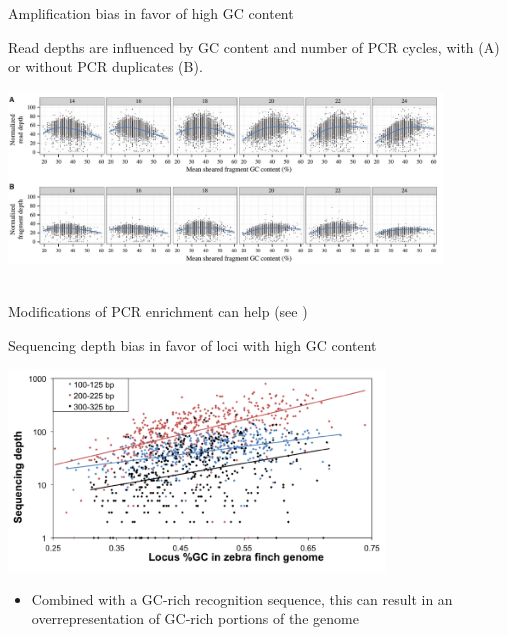\documentclass[presentation]{beamer}
\begin{document}
\begin{frame}[label=sec-3-2-2]{Amplification bias in favor of high GC content}
 \begin{center}
Read depths are influenced by GC content and number of PCR cycles, with (A) or without  PCR duplicates (B).

\includegraphics[width=11.5cm]{Davey2013Fig4.png}

 \tiny{\citep{Davey2013}}\\
\normalsize{
Modifications of PCR enrichment can help \tiny{(see \citep{Puritz2014b,Benjamini2012})}}

 \end{center}
\end{frame}
\begin{frame}[label=sec-3-2-3]{Sequencing depth bias in favor of loci with high GC content}
\begin{center}
\includegraphics[width=10cm]{DaCosta2014Fig1c.png}

\tiny{\citep{Dacosta2014}}
\end{center}
\begin{itemize}
\item Combined with a GC-rich recognition sequence, this can result
in an overrepresentation of GC-rich portions of the genome
\end{itemize}
\end{frame}
\end{document}
